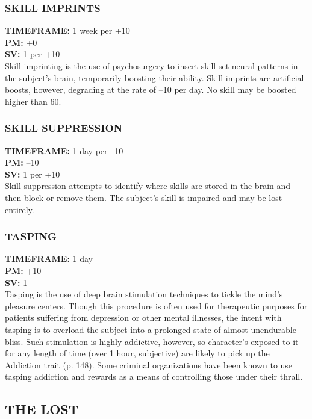 \subsubsection{SKILL IMPRINTS} \textbf{TIMEFRAME:} 1 week per +10 \\ \textbf{PM:} +0 \\ \textbf{SV:} 1 per +10 \\ Skill imprinting is the use of psychosurgery to insert skill-set neural patterns in the subject’s brain, temporarily boosting their ability. Skill imprints are artificial boosts, however, degrading at the rate of –10 per day. No skill may be boosted higher than 60. 

\subsubsection{SKILL SUPPRESSION} \textbf{TIMEFRAME:} 1 day per –10 \\ \textbf{PM:} –10 \\ \textbf{SV:} 1 per +10 \\ Skill suppression attempts to identify where skills are stored in the brain and then block or remove them. The subject’s skill is impaired and may be lost entirely. 

\subsubsection{TASPING} \textbf{TIMEFRAME:} 1 day \\ \textbf{PM:} +10 \\ \textbf{SV:} 1 \\ Tasping is the use of deep brain stimulation techniques to tickle the mind’s pleasure centers. Though this procedure is often used for therapeutic purposes for patients suffering from depression or other mental illnesses, the intent with tasping is to overload the subject into a prolonged state of almost unendurable bliss. Such stimulation is highly addictive, however, so character’s exposed to it for any length of time (over 1 hour, subjective) are likely to pick up the Addiction trait (p. 148). Some criminal organizations have been known to use tasping addiction and rewards as a means of controlling those under their thrall. 



\subsection{THE LOST} 


